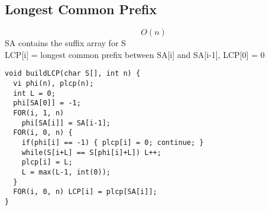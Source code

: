 \documentclass[11pt, oneside]{article}
\begin{document}
\subsection{Longest Common Prefix}
\[O(n)\]
SA contains the suffix array for S\\
LCP[i] = longest common prefix between SA[i] and SA[i-1], LCP[0] = 0\\
\begin{lstlisting}
void buildLCP(char S[], int n) {
  vi phi(n), plcp(n);
  int L = 0;
  phi[SA[0]] = -1;
  FOR(i, 1, n)
    phi[SA[i]] = SA[i-1];
  FOR(i, 0, n) {
    if(phi[i] == -1) { plcp[i] = 0; continue; }
    while(S[i+L] == S[phi[i]+L]) L++;
    plcp[i] = L;
    L = max(L-1, int(0));
  }
  FOR(i, 0, n) LCP[i] = plcp[SA[i]];
}
\end{lstlisting}
\end{document}
